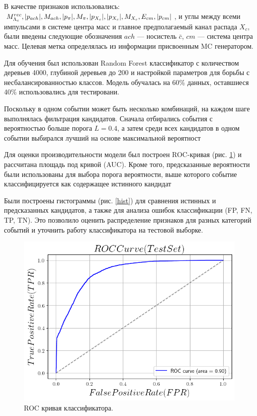 В качестве признаков использовались: $M^{rec}_{\Lambda_c}, \abs{p_{ach}}, M_{ach}, \abs{p_{\pi}}, M_{\pi}, \abs{p_{X_c}}, \abs{p_{X_c}}, M_{X_c}, E_{cm}, \abs{p_{cm}}$, и углы между всеми импульсами в системе центра масс и главное предполагаемый канал распада $X_c$, были введены следующие обозначения $ach$ --- носистель $\bar c$,  $cm$ --- система центра масс. Целевая метка определялась из информации присвоенным MC генератором.

Для обучения был использован Random Forest классификатор с количеством деревьев 4000, глубиной деревьев до 200 и настройкой параметров для борьбы с несбалансированностью классов. Модель обучалась на 60\% данных, оставшиеся 40\% использовались для тестировани.

Поскольку в одном событии может быть несколько комбинаций, на каждом шаге выполнялась фильтрация кандидатов. Сначала отбирались события с вероятностью больше порога $L = 0.4$, а затем среди всех кандидатов в одном событии выбирался лучший на основе максимальной вероятност

Для оценки производительности модели был построен ROC-кривая (рис. \ref{ROC}) и рассчитана площадь под кривой (AUC). Кроме того, предсказанные вероятности были использованы для выбора порога вероятности, выше которого событие классифицируется как содержащее истинного кандидат

Были построены гистограммы (рис. \ref{hist}) для сравнения истинных и предсказанных кандидатов, а также для анализа ошибок классификации (FP, FN, TP, TN). Это позволило оценить распределение признаков для разных категорий событий и уточнить работу классификатора на тестовой выборке.

\begin{figure}[H]
    \centering
    \includegraphics[width=0.7\linewidth]{img/ROC_f.png}
    \caption{ROC кривая классификатора.}
    \label{ROC}
\end{figure}

